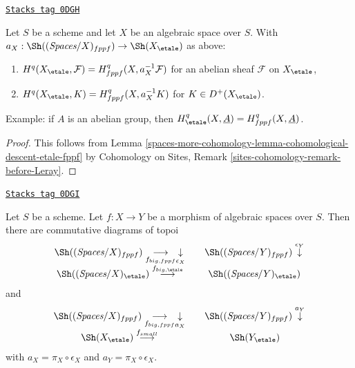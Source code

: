 \begin{lemma}
\label{spaces-more-cohomology-lemma-compare-cohomology-etale-fppf}
\href{https://stacks.math.columbia.edu/tag/0DGH}{\texttt{Stacks tag 0DGH}}

Let $S$ be a scheme and let $X$ be an algebraic space over $S$.
With $a_X : \Sh((\textit{Spaces}/X)_{fppf}) \to \Sh(X_\etale)$
as above:
\begin{enumerate}
\item $H^q(X_\etale, \mathcal{F}) = H^q_{fppf}(X, a_X^{-1}\mathcal{F})$
for an abelian sheaf $\mathcal{F}$ on $X_\etale$,
\item $H^q(X_\etale, K) = H^q_{fppf}(X, a_X^{-1}K)$ for $K \in D^+(X_\etale)$.
\end{enumerate}
Example: if $A$ is an abelian group, then
$H^q_\etale(X, \underline{A}) = H^q_{fppf}(X, \underline{A})$.
\end{lemma}

\begin{proof}
This follows from Lemma \ref{spaces-more-cohomology-lemma-cohomological-descent-etale-fppf}
by Cohomology on Sites, Remark \ref{sites-cohomology-remark-before-Leray}.
\end{proof}

\begin{lemma}
\label{spaces-more-cohomology-lemma-push-pull-fppf-etale}
\href{https://stacks.math.columbia.edu/tag/0DGI}{\texttt{Stacks tag 0DGI}}

Let $S$ be a scheme.
Let $f : X \to Y$ be a morphism of algebraic spaces over $S$.
Then there are commutative diagrams of topoi
$$
\begin{array}{ccc}\Sh((\textit{Spaces}/X)_{fppf}) \underset{f_{big, fppf}}{\longrightarrow}\underset{\epsilon_X}{\downarrow} &  & \Sh((\textit{Spaces}/Y)_{fppf}) \overset{\epsilon_Y}{\downarrow} \\ \Sh((\textit{Spaces}/X)_\etale) \overset{f_{big, \etale}}{\longrightarrow} &  & \Sh((\textit{Spaces}/Y)_\etale)\end{array}
$$
and
$$
\begin{array}{ccc}\Sh((\textit{Spaces}/X)_{fppf}) \underset{f_{big, fppf}}{\longrightarrow}\underset{a_X}{\downarrow} &  & \Sh((\textit{Spaces}/Y)_{fppf}) \overset{a_Y}{\downarrow} \\ \Sh(X_\etale) \overset{f_{small}}{\longrightarrow} &  & \Sh(Y_\etale)\end{array}
$$
with $a_X = \pi_X \circ \epsilon_X$ and $a_Y = \pi_X \circ \epsilon_X$.
\end{lemma}

